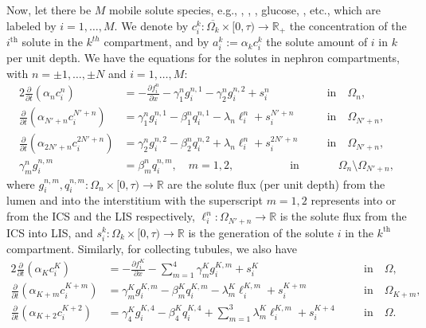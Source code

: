 \documentclass{article}
\begin{document}

Now, let there be $M$ mobile solute species, e.g., , , , glucose, , etc., which are labeled by $i=1,\dots,M$.
We denote by $c_i^k:\overline{\Omega_k}\times [0,\tau)\to \mathbb{R}_+$ the concentration of the $i^{\mathrm{th}}$ solute in the $k^{th}$ compartment, and by $a_i^k:=\alpha_kc_i^k$ the solute amount of $i$ in $k$ per unit depth.
We have the equations for the solutes in nephron compartments, with $n=\pm 1,\dots,\pm N$ and $i=1,\dots,M$:
\begin{alignat}{2}
    \frac{\partial }{\partial t}(\alpha_nc_i^n) &= -\frac{\partial f_i^n}{\partial x}-\gamma_1^ng_i^{n,1}-\gamma_2^ng_i^{n,2}+s_i^{n} \qquad \ &&\text{in}\quad \Omega_{n},\\
    \frac{\partial }{\partial t}(\alpha_{N'+n}c_i^{N'+n}) &= \gamma_1^ng_i^{n,1}-\beta_1^nq_i^{n,1}-\lambda_n\ell_i^n+s_i^{N'+n} \quad \ &&\text{in}\quad \Omega_{N'+n},\\
    \frac{\partial }{\partial t}(\alpha_{2N'+n} c_i^{2N'+n}) &= \gamma_2^ng_i^{n,2}-\beta_2^nq_i^{n,2}+\lambda_n\ell_i^n+s_i^{2N'+n}\quad &&\text{in}\quad \Omega_{N'+n},\\
    \gamma_m^ng_i^{n,m} &= \beta_m^nq_i^{n,m},\quad m=1,2, \qquad \qquad \quad \text{in}&&\quad \Omega_n\setminus\Omega_{N'+n},
\end{alignat}
    where $g_i^{n,m},q_i^{n,m}:\Omega_n\times [0,\tau)\to \mathbb{R}$ are the solute flux (per unit depth) from the lumen and into the interstitium with the superscript $m=1,2$ represents into or from the ICS and the LIS respectively, $\ell_i^n:\Omega_{N'+n}\to \mathbb{R}$ is the solute flux from the ICS into LIS, and $s_i^{k}:\Omega_k\times [0,\tau)\to \mathbb{R}$ is the generation of the solute $i$ in the $k^{\mathrm{th}}$ compartment.
Similarly, for collecting tubules, we also have
\begin{alignat}{2}
    \frac{\partial }{\partial t}(\alpha_Kc_i^K) &= -\frac{\partial f_i^K}{\partial x}-\sum_{m=1}^4 \gamma_m^Kg_i^{K,m}+s_i^K \qquad \ &&\text{in}\quad \Omega,\\
    \frac{\partial }{\partial t}(\alpha_{K+m}c_i^{K+m}) &= \gamma_m^Kg_i^{K,m}-\beta_m^Kq_i^{K,m}-\lambda_m^K\ell_i^{K,m}+s_i^{K+m} \quad \ &&\text{in}\quad \Omega_{K+m},\\
    \frac{\partial }{\partial t}(\alpha_{K+2} c_i^{K+2}) &= \gamma_4^Kg_i^{K,4}-\beta_4^Kq_i^{K,4}+\sum_{m=1}^3\lambda_m^K\ell_i^{K,m}+s_i^{K+4}\quad &&\text{in}\quad \Omega.
\end{alignat}
\end{document}
